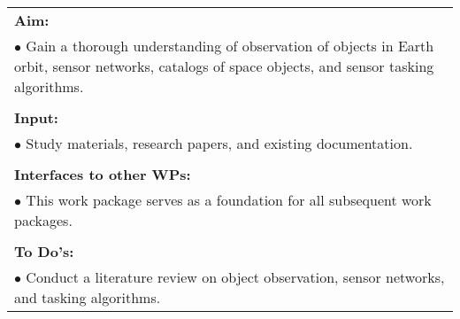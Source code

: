 \begin{table}[!h]
\begin{center}
\begin{tabular}{|p{35mm}||p{55mm}|p{50mm}||p{40mm}|}
      \hline\hline
      \multicolumn{4}{|p{150mm}|}{\textbf{Aim:}}                                                                                                                                                            \\
      \multicolumn{4}{|p{150mm}|}{$\bullet$ Gain a thorough understanding of observation of objects in Earth orbit, sensor networks, catalogs of space objects, and sensor tasking algorithms.}                                                   \\
      \multicolumn{4}{|p{150mm}|}{}                                                                                                                                                                           \\
      \multicolumn{4}{|p{150mm}|}{\textbf{Input:}}                                                                                                                                                            \\
      \multicolumn{4}{|p{150mm}|}{$\bullet$ Study materials, research papers, and existing documentation.}                                                                                                                                 \\
      \multicolumn{4}{|p{150mm}|}{}                                                                                                                                                                           \\
      \multicolumn{4}{|p{150mm}|}{\textbf{Interfaces to other WPs:}}                                                                                                                                    \\
      \multicolumn{4}{|p{150mm}|}{$\bullet$ This work package serves as a foundation for all subsequent work packages.}                                                                                              \\
      \multicolumn{4}{|p{150mm}|}{}                                                                                                                                                                           \\
      \multicolumn{4}{|p{150mm}|}{\textbf{To Do's:}}                                                                                                                                                         \\
      \multicolumn{4}{|p{150mm}|}{$\bullet$ Conduct a literature review on object observation, sensor networks, and tasking algorithms.}\\

\end{tabular}
\end{center}
\end{table}
